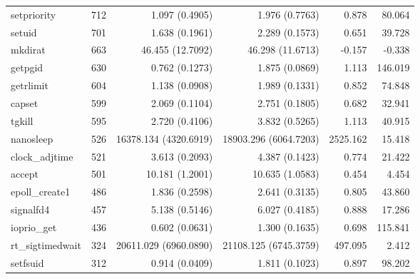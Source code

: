 \begin{longtable}{>{\ttfamily}lrrrrr}
                    setpriority &        712 &              1.097 (0.4905) &            1.976 (0.7763) &           0.878 &       80.064 \\
                         setuid &        701 &              1.638 (0.1961) &            2.289 (0.1573) &           0.651 &       39.728 \\
                        mkdirat &        663 &            46.455 (12.7092) &          46.298 (11.6713) &          -0.157 &       -0.338 \\
                        getpgid &        630 &              0.762 (0.1273) &            1.875 (0.0869) &           1.113 &      146.019 \\
                      getrlimit &        604 &              1.138 (0.0908) &            1.989 (0.1331) &           0.852 &       74.848 \\
                         capset &        599 &              2.069 (0.1104) &            2.751 (0.1805) &           0.682 &       32.941 \\
                         tgkill &        595 &              2.720 (0.4106) &            3.832 (0.5265) &           1.113 &       40.915 \\
                      nanosleep &        526 &       16378.134 (4320.6919) &     18903.296 (6064.7203) &        2525.162 &       15.418 \\
                 clock\_adjtime &        521 &              3.613 (0.2093) &            4.387 (0.1423) &           0.774 &       21.422 \\
                         accept &        501 &             10.181 (1.2001) &           10.635 (1.0583) &           0.454 &        4.454 \\
                 epoll\_create1 &        486 &              1.836 (0.2598) &            2.641 (0.3135) &           0.805 &       43.860 \\
                      signalfd4 &        457 &              5.138 (0.5146) &            6.027 (0.4185) &           0.888 &       17.286 \\
                    ioprio\_get &        436 &              0.602 (0.0631) &            1.300 (0.1635) &           0.698 &      115.841 \\
               rt\_sigtimedwait &        324 &       20611.029 (6960.0890) &     21108.125 (6745.3759) &         497.095 &        2.412 \\
                       setfsuid &        312 &              0.914 (0.0409) &            1.811 (0.1023) &           0.897 &       98.202 \\

\end{longtable}
